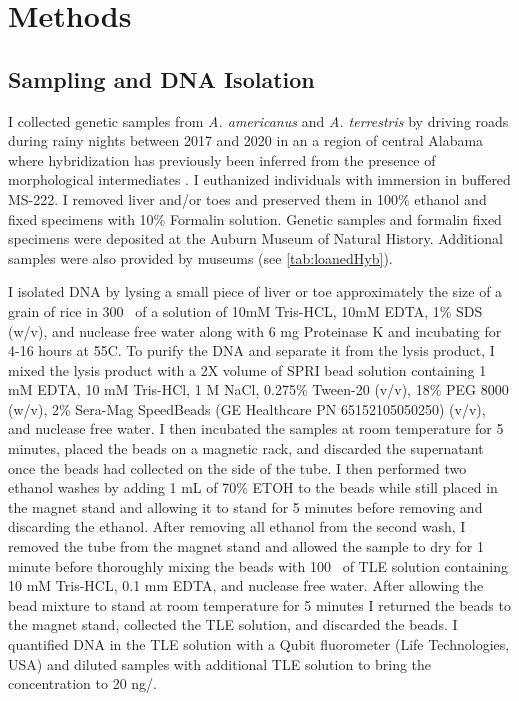 \section{Methods}
\subsection{Sampling and DNA Isolation}
I collected genetic samples from \textit{A. americanus} and \textit{A. terrestris}
by driving roads during rainy nights between 2017 and 2020
in an a region of central Alabama where hybridization has previously been
inferred from the presence of morphological intermediates \parencite{weatherby1982}. 
I euthanized individuals with immersion in buffered MS-222.
I removed liver and/or toes and preserved them in 100\% ethanol and fixed 
specimens with 10\% Formalin solution.
Genetic samples and formalin fixed specimens were deposited at the Auburn Museum of Natural History.
Additional samples were also provided by museums (see \cref{tab:loanedHyb}).

I isolated DNA by lysing a small piece of liver or toe approximately 
the size of a grain of rice in 300 \uL\ of a solution of 10mM Tris-HCL, 10mM EDTA, 
1\% SDS (w/v), and nuclease free water along with 6 mg Proteinase K and 
incubating for 4-16 hours at 55\degree C.  
To purify the DNA and separate it from the lysis product, I mixed the lysis 
product with a 2X volume of SPRI bead solution containing 1 mM EDTA,  
10 mM Tris-HCl, 1 M NaCl, 0.275\% Tween-20 (v/v), 18\% PEG 8000 (w/v), 
2\% Sera-Mag SpeedBeads (GE Healthcare PN 65152105050250) (v/v), and nuclease free water.
I then incubated the samples at room temperature for 5 minutes, placed the 
beads on a magnetic rack, and discarded the supernatant once the beads had collected
on the side of the tube.  
I then performed two ethanol washes by adding 1 mL of 70\% ETOH to the beads
while still placed in the magnet stand and allowing it to stand for 5 minutes
before removing and discarding the ethanol. 
After removing all ethanol from the second wash, I removed the tube from the magnet 
stand and allowed the sample to dry for 1 minute before thoroughly mixing the beads with 100 \uL\ of 
TLE solution containing 10 mM Tris-HCL, 0.1 mm EDTA, and nuclease free water.
After allowing the bead mixture to stand at room temperature for 5 minutes I returned
the beads to the magnet stand, collected the TLE solution, and discarded the beads. 
I quantified DNA in the TLE solution with a Qubit
fluorometer (Life Technologies, USA) and diluted samples with additional TLE solution to 
bring the concentration to 20 ng/\uL.

